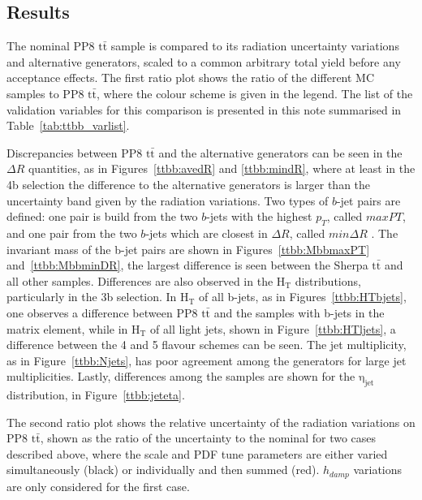 \subsection{Results}
The nominal PP8 $\mathrm{t\bar{t}}$ sample is compared to its radiation uncertainty variations and alternative generators, 
scaled to a common arbitrary total yield before any acceptance effects.
The first ratio plot shows the ratio of the different MC samples to PP8 $\mathrm{t\bar{t}}$, where the colour scheme is given in the legend.
The list of the validation variables for this comparison is presented in this note summarised in Table~\ref{tab:ttbb_varlist}.

Discrepancies between PP8 $\mathrm{t\bar{t}}$ and the alternative generators can be seen in the $\Delta R$ quantities, as in Figures~\ref{ttbb:avedR} and \ref{ttbb:mindR}, where at least in the 4b selection the difference to the alternative generators is larger than the uncertainty band given by the radiation variations.  
Two types of $b$-jet pairs are defined: one pair is build from the two $b$-jets with the highest $p_T$, called $maxPT$, and one pair from the two $b$-jets which are closest in $\Delta R$, called $min \Delta R$ . The invariant mass of the b-jet pairs are shown in Figures~\ref{ttbb:MbbmaxPT} and~\ref{ttbb:MbbminDR}, the largest difference is seen between the Sherpa $\mathrm{t\bar{t}}$ and all other samples.
%
Differences are also observed in the $\mathrm{H_T}$ distributions, particularly in the 3b selection. In $\mathrm{H_T}$ of all b-jets, as in Figures~\ref{ttbb:HTbjets}, one observes a difference between PP8 $\mathrm{t\bar{t}}$ and the samples with b-jets in the matrix element, while in $\mathrm{H_T}$ of all light jets, shown in Figure~\ref{ttbb:HTljets}, a difference between the 4 and 5 flavour schemes can be seen. The jet multiplicity, as in Figure~\ref{ttbb:Njets}, has poor agreement among the generators for large jet multiplicities.
Lastly, differences among the samples are shown for the $\mathrm{\eta_{jet}}$ distribution, in Figure~\ref{ttbb:jeteta}.

The second ratio plot shows the relative uncertainty of the radiation variations on PP8 $\mathrm{t\bar{t}}$, shown as the ratio of the uncertainty to the nominal for two cases described above, where the scale and PDF tune parameters are either varied simultaneously (black) or individually and then summed (red). $h_{damp}$ variations are only considered for the first case.



